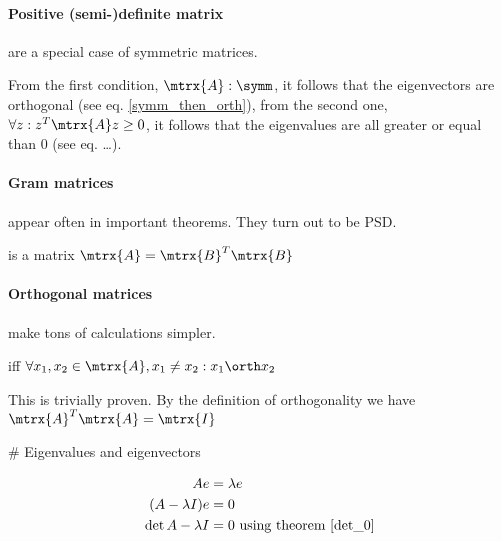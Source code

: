 \paragraph{Positive (semi-)definite matrix} are a special case of symmetric matrices.
\begin{definition}
    From the first condition, $\mtrx{A}: \symm$, it follows that the eigenvectors are orthogonal (see eq. \ref{symm_then_orth}), 
    from the second one, $\forall z: z^T \mtrx{A} z \geq 0$, it follows that the eigenvalues are all greater or equal than $0$ (see eq. \dots).
\end{definition}


\paragraph{Gram matrices} appear often in important theorems. They turn out to be PSD.
\begin{definition}
     is a matrix $\mtrx{A} = \mtrx{B}^T \mtrx{B}$
\end{definition}

\begin{theorem}
    [$\rank{A} = \rank{A^T A}$]
\end{theorem}

\begin{theorem}
    [$A^T A: \PSD$]
\end{theorem}


\paragraph{Orthogonal matrices} make tons of calculations simpler.
\begin{definition} iff $\forall x_1, x_2 \in \mtrx{A}, x_1 \neq x_2: x_1 \orth x_2$
\end{definition}

\begin{theorem}
    [If $A$ is orthogonal, than $A^{-1} = A^T$.]
    This is trivially proven. By the definition of orthogonality we have $\mtrx{A}^T \mtrx{A} = \mtrx{I}$
\end{theorem}








# Eigenvalues and eigenvectors

\begin{equation}
    \begin{aligned}
        A e &= \lambda e \\
        ( A - \lambda I ) e &= 0 \\
        \det{A - \lambda I} &= 0 \text{ using theorem \ref{det_0}}
    \end{aligned}
\end{equation}

